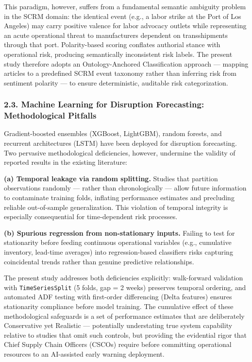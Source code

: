 \documentclass[conference]{IEEEtran}
\begin{document}
This paradigm, however, suffers from a fundamental semantic ambiguity
problem in the SCRM domain: the identical event (e.g., a labor strike at
the Port of Los Angeles) may carry positive valence for labor advocacy
outlets while representing an acute operational threat to manufacturers
dependent on transshipments through that port. Polarity-based scoring
conflates authorial stance with operational risk, producing semantically
inconsistent risk labels. The present study therefore adopts an
Ontology-Anchored Classification approach --- mapping articles to a
predefined SCRM event taxonomy rather than inferring risk from sentiment
polarity --- to ensure deterministic, auditable risk categorization.

\subsubsection{2.3. Machine Learning for Disruption Forecasting:
Methodological
Pitfalls}\label{machine-learning-for-disruption-forecasting-methodological-pitfalls}

Gradient-boosted ensembles (XGBoost, LightGBM), random forests, and
recurrent architectures (LSTM) have been deployed for disruption
forecasting. Two pervasive methodological deficiencies, however,
undermine the validity of reported results in the existing literature:

\textbf{(a) Temporal leakage via random splitting.} Studies that
partition observations randomly --- rather than chronologically ---
allow future information to contaminate training folds, inflating
performance estimates and precluding reliable out-of-sample
generalization. This violation of temporal integrity is especially
consequential for time-dependent risk processes.

\textbf{(b) Spurious regression from non-stationary inputs.} Failing to
test for stationarity before feeding continuous operational variables
(e.g., cumulative inventory, lead-time averages) into regression-based
classifiers risks capturing coincidental trends rather than genuine
predictive relationships.

The present study addresses both deficiencies explicitly: walk-forward
validation with \texttt{TimeSeriesSplit} (5 folds, gap = 2 weeks)
preserves temporal ordering, and automated ADF testing with first-order
differencing (Delta features) ensures stationarity compliance before
model training. The cumulative effect of these methodological safeguards
is a set of performance estimates that are deliberately Conservative yet
Realistic --- potentially understating true system capability relative
to studies that omit such controls, but providing the evidential rigor
that Chief Supply Chain Officers (CSCOs) require before committing
operational resources to an AI-assisted early warning deployment.
\end{document}
